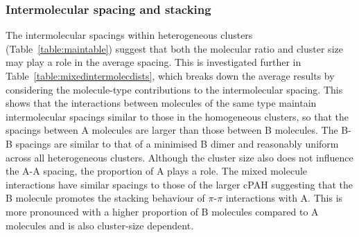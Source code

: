 \subsubsection{Intermolecular spacing and stacking}
The intermolecular spacings within heterogeneous clusters (Table~\ref{table:maintable}) suggest that both the molecular ratio and cluster size may play a role in the average spacing. This is investigated further in Table~\ref{table:mixedintermolecdists}, which breaks down the average results by considering the molecule-type contributions to the intermolecular spacing. This shows that the interactions between molecules of the same type maintain intermolecular spacings similar to those in the homogeneous clusters, so that the spacings between A molecules are larger than those between B molecules. The B-B spacings are similar to that of a minimised B dimer and reasonably uniform across all heterogeneous clusters.  %
Although the cluster size also does not influence the A-A spacing, the proportion of A plays a role. The mixed molecule interactions have similar spacings to those of the larger cPAH suggesting that the B molecule promotes the stacking behaviour of $\pi$-$\pi$ interactions with A. This is more pronounced with a higher proportion of B molecules compared to A molecules and is also cluster-size dependent. 

